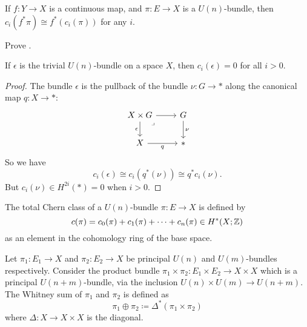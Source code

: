 \documentclass[ma3408.tex]{subfiles}
\begin{document}
\begin{Prop}\label{prop:functoriality-of-chern-classes}
If $f \colon Y \to X$ is a continuous map, and $\pi \colon E \to X$ is a $U(n)$-bundle, then $c_i(f^*\pi) \cong f^*(c_i(\pi))$ for any $i$.
\end{Prop}
\begin{exercise}{}{}
Prove . 
\end{exercise}
\begin{Cor}\label{cor:chern-classes-trivial-bundle}
If $\epsilon$ is the trivial $U(n)$-bundle on a space $X$, then $c_i(\epsilon) = 0 $ for all $i > 0$. 
\end{Cor}
\begin{proof}
The bundle $\epsilon$ is the pullback of the bundle $\nu \colon G \to {\ast}$ along the canonical map $q \colon X \to \ast$:
\[\begin{tikzcd}[ampersand replacement=\&]
    {X \times G} \& G \\
    X \& \ast
    \arrow["\nu", from=1-2, to=2-2]
    \arrow["q"', from=2-1, to=2-2]
    \arrow["\epsilon"', from=1-1, to=2-1]
    \arrow[from=1-1, to=1-2]
    \arrow["\lrcorner"{anchor=center, pos=0.125}, draw=none, from=1-1, to=2-2]
\end{tikzcd}\]
 So we have
\[
c_i(\epsilon) \cong c_i(q^*(\nu)) \cong q^*c_i(\nu).
\]
But $c_i(\nu) \in H^{2i}(\ast) = 0$ when $i>0$. 
\end{proof}
\begin{Def}
The total Chern class of a $U(n)$-bundle $\pi \colon E \to X$ is defined by
\[
c(\pi) = c_0(\pi) + c_1(\pi) + \cdots + c_n(\pi) \in H^*(X;\mathbb{Z})
\]
as an element in the cohomology ring of the base space. 
\end{Def}
\begin{Def}
Let $\pi_1 \colon E_1 \to X$ and $\pi_2 \colon E_2 \to X$ be principal $U(n)$ and $U(m)$-bundles respectively. Consider the product bundle $\pi_1 \times \pi_2 \colon E_1 \times E_2 \to X \times X$ which is a principal $U(n+m)$-bundle, via the inclusion $U(n) \times U(m) \to U(n+m)$. The Whitney sum of $\pi_1$ and $\pi_2$ is defined as
\[
\pi_1 \oplus \pi_2 \coloneqq \Delta^*(\pi_1 \times \pi_2)
\]
where $\Delta \colon X \to X \times X$ is the diagonal.
\end{Def}
\end{document}
